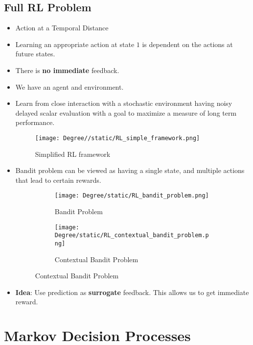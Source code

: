 \documentclass[a4paper]{article}
\begin{document}
\subsection{Full RL Problem}
\begin{itemize}
    \item Action at a Temporal Distance
    \item Learning an appropriate action at state $1$ is dependent on the actions at future states.
    \item There is \textbf{no immediate} feedback.
    \item We have an agent and environment.
    \item Learn from close interaction with a stochastic environment having noisy delayed scalar evaluation with a goal to maximize a measure of long term performance.
    \begin{figure}[H]
        \centering
        \texttt{[image: Degree//static/RL\_simple\_framework.png]}
        \caption{Simplified RL framework}
    \end{figure}
    \item Bandit problem can be viewed as having a single state, and multiple actions that lead to certain rewards.
    \begin{figure}[H]
        \centering
        \begin{subfigure}[b]{0.45\textwidth}
            \centering
            \texttt{[image: Degree/static/RL\_bandit\_problem.png]}
            \caption{Bandit Problem}
        \end{subfigure}
        \hfill
        \begin{subfigure}[b]{0.45\textwidth}
            \centering
            \texttt{[image: Degree/static/RL\_contextual\_bandit\_problem.png]}
            \caption{Contextual Bandit Problem}
        \end{subfigure}
    \end{figure}
    \item \textbf{Idea}: Use prediction as \textbf{surrogate} feedback. This allows us to get immediate reward.
\end{itemize}

\section{Markov Decision Processes}
\end{document}
